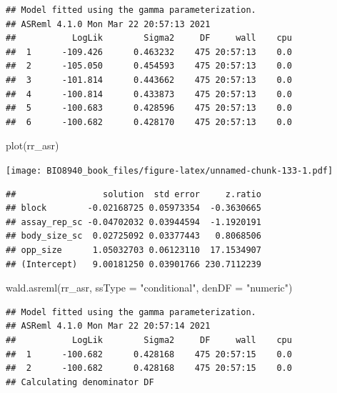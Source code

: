 \documentclass[
  12pt,
]{book}
\newenvironment{Shaded}{\begin{snugshade}}{\end{snugshade}}
\newcommand{\AttributeTok}[1]{\textcolor[rgb]{0.77,0.63,0.00}{#1}}
\newcommand{\ConstantTok}[1]{\textcolor[rgb]{0.00,0.00,0.00}{#1}}
\newcommand{\FunctionTok}[1]{\textcolor[rgb]{0.00,0.00,0.00}{#1}}
\newcommand{\NormalTok}[1]{#1}
\newcommand{\SpecialCharTok}[1]{\textcolor[rgb]{0.00,0.00,0.00}{#1}}
\newcommand{\StringTok}[1]{\textcolor[rgb]{0.31,0.60,0.02}{#1}}
\begin{document}
\begin{verbatim}
## Model fitted using the gamma parameterization.
## ASReml 4.1.0 Mon Mar 22 20:57:13 2021
##           LogLik        Sigma2     DF     wall    cpu
##  1      -109.426      0.463232    475 20:57:13    0.0
##  2      -105.050      0.454593    475 20:57:13    0.0
##  3      -101.814      0.443662    475 20:57:13    0.0
##  4      -100.814      0.433873    475 20:57:13    0.0
##  5      -100.683      0.428596    475 20:57:13    0.0
##  6      -100.682      0.428170    475 20:57:13    0.0
\end{verbatim}

\begin{Shaded}
\begin{Highlighting}[]
\FunctionTok{plot}\NormalTok{(rr\_asr)}
\end{Highlighting}
\end{Shaded}

\texttt{[image: BIO8940\_book\_files/figure-latex/unnamed-chunk-133-1.pdf]}

\begin{Shaded}
\end{Shaded}

\begin{verbatim}
##                 solution  std error     z.ratio
## block        -0.02168725 0.05973354  -0.3630665
## assay_rep_sc -0.04702032 0.03944594  -1.1920191
## body_size_sc  0.02725092 0.03377443   0.8068506
## opp_size      1.05032703 0.06123110  17.1534907
## (Intercept)   9.00181250 0.03901766 230.7112239
\end{verbatim}

\begin{Shaded}
\begin{Highlighting}[]
\FunctionTok{wald.asreml}\NormalTok{(rr\_asr, }\AttributeTok{ssType =} \StringTok{"conditional"}\NormalTok{, }\AttributeTok{denDF =} \StringTok{"numeric"}\NormalTok{)}
\end{Highlighting}
\end{Shaded}

\begin{verbatim}
## Model fitted using the gamma parameterization.
## ASReml 4.1.0 Mon Mar 22 20:57:14 2021
##           LogLik        Sigma2     DF     wall    cpu
##  1      -100.682      0.428168    475 20:57:15    0.0
##  2      -100.682      0.428168    475 20:57:15    0.0
## Calculating denominator DF
\end{verbatim}
\end{document}
